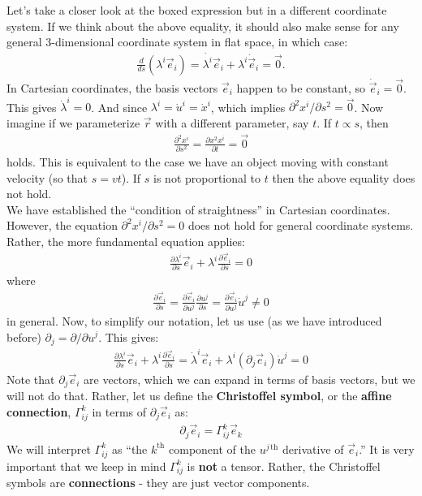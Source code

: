 \documentclass{book}
\theoremstyle{definition}
\begin{document}
Let's take a closer look at the boxed expression but in a different coordinate system. If we think about the above equality, it should also make sense for any general 3-dimensional coordinate system in flat space, in which case:
\begin{align*}
\frac{d}{ds}\left(\lambda^i \vec{e}_i \right) = \dot{\lambda^i}\vec{e}_i + \lambda^i\dot{\vec{e}}_i  =  \vec{0}. 
\end{align*}
In Cartesian coordinates, the basis vectors $\vec{e}_i$ happen to be constant, so $\dot{\vec{e}}_i = \vec{0}$. This gives $\dot{\lambda}^i = 0$. And since $\lambda^i = \dot{u}^i = \dot{x}^i$, which implies $\partial^2 x^i/\partial s^2 = \vec{0}$. Now imagine if we parameterize $\vec{r}$ with a different parameter, say $t$. If $t \propto s$, then
\begin{align*}
\frac{\partial^2 x^i}{\partial s^2} = \frac{\partial x^2 x^i}{\partial t} = \vec{0}
\end{align*}
holds. This is equivalent to the case we have an object moving with constant velocity (so that $s = vt$). If $s$ is not proportional to $t$ then the above equality does not hold.\\

We have established the ``condition of straightness'' in Cartesian coordinates. However, the equation $\partial^2 x^i/\partial s^2 = 0$ does not hold for general coordinate systems. Rather, the more fundamental equation applies:
\begin{align*}
\boxed{\frac{\partial \lambda^i}{\partial s}\vec{e}_i + \lambda^i\frac{\partial \vec{e}_i}{\partial s} = 0}
\end{align*}
where 
\begin{align*}
\frac{\partial \vec{e}_i}{\partial s} = \frac{\partial \vec{e}_i}{\partial u^j}\frac{\partial u^j}{\partial s}  = \frac{\partial \vec{e}_i}{\partial u^j}\dot{u}^j \neq 0
\end{align*}
in general. Now, to simplify our notation, let us use (as we have introduced before) $\partial_j = \partial/\partial u^j$. This gives:
\begin{align*}
\frac{\partial \lambda^i}{\partial s}\vec{e}_i + \lambda^i\frac{\partial \vec{e}_i}{\partial s} 
=  \dot{\lambda}^i\vec{e}_i + \lambda^i\left( \partial_j \vec{e}_i\right)\dot{u}^j 
=0
\end{align*} 
Note that $\partial_j\vec{e}_i$ are vectors, which we can expand in terms of basis vectors, but we will not do that. Rather, let us define the \textbf{Christoffel symbol}, or the \textbf{affine connection}, $\Gamma^{k}_{ij}$ in terms of $\partial_j\vec{e}_i$ as:
\begin{align*}
\boxed{\partial_j\vec{e}_i = \Gamma^{k}_{ij}\vec{e}_k}
\end{align*}
We will interpret $\Gamma^{k}_{ij}$ as ``the $k^{\text{th}}$ component of the $u^{j\,\text{th}}$ derivative of $\vec{e}_i$.'' It is very important that we keep in mind $\Gamma^{k}_{ij}$ is \textbf{not} a tensor. Rather, the Christoffel symbols are \textbf{connections} - they are just vector components.\\
\end{document}
